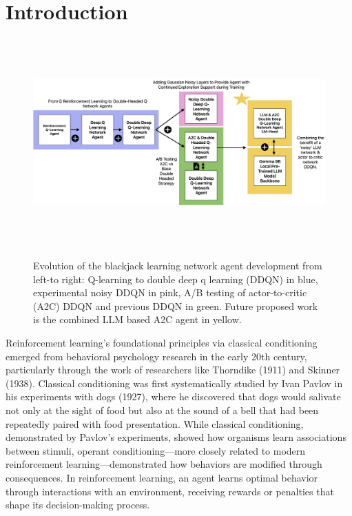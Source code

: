 \documentclass[compsoc]{IEEEtran}
\begin{document}
\maketitle
\IEEEdisplaynontitleabstractindextext


\IEEEpeerreviewmaketitle



\section{Introduction}\label{sec:introduction}

\begin{figure}[h]
\centering
{\includegraphics[width=\textwidth, height=8cm]{./fig/fig1_rl_dqns.png}}
\caption{Evolution of the blackjack learning network agent development from left-to right: Q-learning to double deep q learning (DDQN) in blue, experimental noisy DDQN in pink, A/B testing of actor-to-critic (A2C) DDQN and previous DDQN in green. Future proposed work is the combined LLM based A2C agent in yellow.}
\end{figure}


Reinforcement learning's foundational principles via classical conditioning emerged from behavioral psychology research in the early 20th century, particularly through the work of researchers like Thorndike (1911) and Skinner (1938). Classical conditioning was first systematically studied by Ivan Pavlov in his experiments with dogs (1927), where he discovered that dogs would salivate not only at the sight of food but also at the sound of a bell that had been repeatedly paired with food presentation. While classical conditioning, demonstrated by Pavlov's experiments, showed how organisms learn associations between stimuli, operant conditioning—more closely related to modern reinforcement learning—demonstrated how behaviors are modified through consequences. In reinforcement learning, an agent learns optimal behavior through interactions with an environment, receiving rewards or penalties that shape its decision-making process. 
\end{document}

